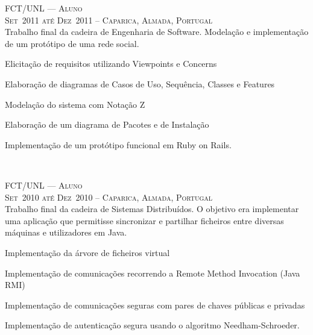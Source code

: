 \documentclass[a4paper,fontsize=10pt]{scrartcl} %
\begin{document}
\begin{minipage}[t]{0.5\textwidth}
\textsc{FCT/UNL --- Aluno}\\
\small\textsc{Set~2011 até Dez~2011 -- Caparica, Almada, Portugal}\\ \normalsize
Trabalho final da cadeira de Engenharia de Software.
Modelação e implementação de um protótipo de uma rede social.\\
\begin{inparaitem} 
	\item[] Elicitação de requisitos utilizando Viewpoints e Concerns
	\item Elaboração de diagramas de Casos de Uso, Sequência, Classes e Features 
	\item Modelação do sistema com Notação Z
	\item Elaboração de um diagrama de Pacotes e de Instalação
	\item Implementação de um protótipo funcional em Ruby on Rails.
\end{inparaitem}
\\\par

\textsc{FCT/UNL --- Aluno}\\
\small\textsc{Set~2010 até Dez~2010 -- Caparica, Almada, Portugal}\\ \normalsize
Trabalho final da cadeira de Sistemas Distribuídos.
O objetivo era implementar uma aplicação que permitisse sincronizar e partilhar ficheiros entre diversas máquinas e utilizadores em Java.\\
\begin{inparaitem} 
	\item[] Implementação da árvore de ficheiros virtual
	\item Implementação de comunicações recorrendo a Remote Method Invocation (Java RMI)
	\item Implementação de comunicações seguras com pares de chaves públicas e privadas
	\item Implementação de autenticação segura usando o algoritmo Needham-Schroeder.
\end{inparaitem}
\\\par


\end{minipage}
\end{document}

